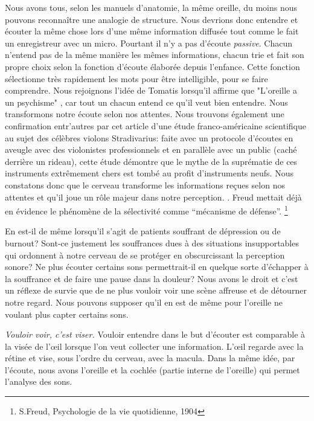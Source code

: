 Nous avons tous,
selon les manuels d'anatomie, la même
oreille, du moins nous pouvons reconnaître une analogie de structure. Nous devrions donc entendre et écouter la même chose
lors d'une même information diffusée tout comme le fait un enregistreur avec un micro. Pourtant il n'y a pas d'écoute \emph{passive}. Chacun n'entend pas de la même manière les mêmes
informations, chacun trie et fait son propre choix selon la fonction
d'écoute élaborée depuis l'enfance. Cette fonction sélectionne très
rapidement les mots pour être intelligible, pour se faire
comprendre. Nous rejoignons l'idée de Tomatis lorsqu'il affirme que
"L'oreille a un psychisme" , car tout un chacun entend ce qu'il veut bien
entendre. \autocite{tomatis_oreille_1998} 
Nous transformons notre écoute selon nos attentes. Nous trouvons
également une confirmation entr'autres par cet 
article d'une 
étude franco-américaine scientifique
\autocite{fritz_stradivarius} au sujet des célèbres violons
Stradivarius: faite avec un protocole 
d'écoutes en aveugle avec
des violonistes professionnels et en parallèle avec un public (caché
derrière un rideau), cette étude démontre que le mythe de la suprématie
de ces instruments extrêmement chers est tombé au profit d'instruments
neufs. Nous constatons donc que le cerveau 
transforme les informations reçues selon nos attentes et qu'il joue un
rôle majeur dans notre perception.
\autocite{lemonde.fr:stradivarius}.
% 
\autocite[p. 43]{roque:lecoute}
 Freud mettait déjà en évidence le phénomène de la
sélectivité comme ``mécanisme de défense''. \footnote{S.Freud,
  Psychologie de la vie quotidienne, 1904}

En est-il de même lorsqu'il s'agit de patients souffrant de dépression
ou de burnout? Sont-ce justement les souffrances dues à des situations
insupportables qui
ordonnent à notre cerveau de se protéger en obscurcissant la
perception sonore?  Ne plus écouter certains
sons permettrait-il en quelque sorte d'échapper à la souffrance et de faire une
pause dans la douleur? Nous avons le droit et c'est un réflexe de
survie que de ne plus vouloir voir une scène affreuse et de détourner
notre regard. Nous pouvons supposer qu'il en est de même pour l'oreille ne voulant plus capter
certains sons.


 \emph{Vouloir voir, c'est viser.}  Vouloir entendre dans le but d'écouter est comparable  à
la visée de l'\oe il lorsque l'on veut collecter une
information. L'\oe il regarde avec la rétine et  vise, sous l'ordre du
cerveau, avec la macula. Dans la même idée, par l'écoute, nous avons
l'oreille et la cochlée (partie interne de l'oreille) qui permet
l'analyse des sons.

